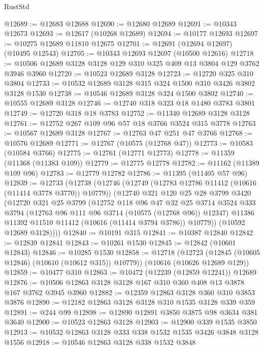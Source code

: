 \begin{lexlean}{RustStd}
\begin{coremodule}
@12689 := @12683 @12688
@12690 := @12680 @12689
@12691 := @10343 @12673
@12693 := @12617 (@10268 @12689)
@12694 := @10177 @12693
@12697 := @10275 @12689 @11810 @12675
@12701 := @12691 (@12694 @12697) (@10495 @12543)
@12705 := @10343 @12693 @12697 (@10500 @12616)
@12718 := @10506 @12689 @3128 @3128 @129 @310 @325 @409 @13 @3804 @129 @3762 @3946 @3960
@12720 := @10523 @12689 @3128
@12723 := @12720 @325 @310 @3804
@12733 := @10532 @12689 @3128 @315 @324 @1500 @310 @3426 @3802 @3128 @1530
@12738 := @10546 @12689 @3128 @324 @1500 @3802
@12740 := @10555 @12689 @3128
@12746 := @12740 @318 @323 @18 @1480 @3783 @3801
@12749 := @12720 @318 @18 @3783
@12752 := @11340 @12689 @3128 @3128
@12761 := @12752 @267 @109 @96 @57 @18 @3766 @3524 @315 @3778
@12763 := @10567 @12689 @3128
@12767 := @12763 @47 @251 @47 @3766
@12768 := @10576 @12689
@12771 := @12767 (@10575 (@12768 @47))
@12773 := @10583 (@10584 @3766)
@12775 := @12761 (@12771 @12773)
@12778 := @11359 (@11368 (@11383 @109))
@12779 := @12775 @12778
@12782 := @11162 (@11389 @109 @96)
@12783 := @12779 @12782
@12786 := @11395 (@11405 @57 @96)
@12839 := @12733
    (@12738
      (@12746
        (@12749 (@12783 @12786 @11412 (@10616 (@11414 @3778 @3770)) @10779))
        (@12740
          @321
          @120
          @25
          @28
          @3799
          @3420
          (@12720
            @321
            @25
            @3799
            (@12752
              @118
              @96
              @47
              @32
              @25
              @3714
              @3524
              @333
              @3794
              (@12763 @96 @111 @96 @3714 (@10575 (@12768 @96)) @12347)
              @11386
              @11392
              @11510
              @11412
              (@10616 (@11414 @3794 @3786))
              @10779))
          (@10592 @12689 @3128))))
@12840 := @10191 @315
@12841 := @10387 @12840
@12842 := @12839 @12841
@12843 := @10261 @1530
@12845 := @12842 (@10601 @12843)
@12846 := @10285 @1530
@12858 := @12718
    (@12723 (@12845 (@10605 @12846) (@10610 (@10612 @315)) @10779))
    (@10616 (@10626 @12689 @129))
@12859 := @10477 @310
@12863 := @10472 (@12239 (@12859 @12241)) @12689
@12876 := @10506 @12863 @3128 @3128 @167 @310 @360 @408 @13 @3878 @167 @3762 @3945 @3960
@12882 := @12359 @12863 @3128 @360 @310 @3853 @3876
@12890 := @12182 @12863 @3128 @3128 @310 @1535 @3128 @339 @359
@12891 := @244 @99
@12898 := @12890 @12891 @3850 @3875 @98 @3634 @381 @3640
@12900 := @10523 @12863 @3128
@12903 := @12900 @339 @1535 @3850
@12913 := @10532 @12863 @3128 @333 @338 @1532 @1535 @3426 @3848 @3128 @1556
@12918 := @10546 @12863 @3128 @338 @1532 @3848

\end{coremodule}
\end{lexlean}
